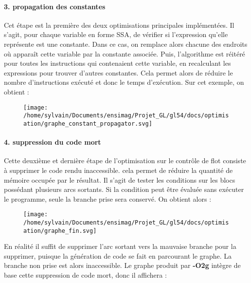 \documentclass[
]{article}
\begin{document}
\hypertarget{3-propagation-des-constantes}{%
\paragraph{3. propagation des
constantes}\label{3-propagation-des-constantes}}

Cet étape est la première des deux optimisations principales
implémentées. Il s'agit, pour chaque variable en forme SSA, de vérifier
si l'expression qu'elle représente est une constante. Dans ce cas, on
remplace alors chacune des endroits où apparaît cette variable par la
constante associée. Puis, l'algorithme est réitéré pour toutes les
instructions qui contenaient cette variable, en recalculant les
expressions pour trouver d'autres constantes. Cela permet alors de
réduire le nombre d'instructions exécuté et donc le temps d'exécution.
Sur cet exemple, on obtient :

\begin{figure}
\centering
\texttt{[image: /home/sylvain/Documents/ensimag/Projet\_GL/gl54/docs/optimisation/graphe\_constant\_propagator.svg]}
\caption{}
\end{figure}

\hypertarget{4-suppression-du-code-mort}{%
\paragraph{\texorpdfstring{4. suppression du code mort
}{4. suppression du code mort }}\label{4-suppression-du-code-mort}}

Cette deuxième et dernière étape de l'optimisation sur le contrôle de
flot consiste à supprimer le code rendu inaccessible. cela permet de
réduire la quantité de mémoire occupée par le résultat. Il s'agit de
tester les conditions sur les blocs possédant plusieurs arcs sortants.
Si la condition peut être évaluée sans exécuter le programme, seule la
branche prise sera conservé. On obtient alors :

\begin{figure}
\centering
\texttt{[image: /home/sylvain/Documents/ensimag/Projet\_GL/gl54/docs/optimisation/graphe\_fin.svg]}
\caption{}
\end{figure}

En réalité il suffit de supprimer l'arc sortant vers la mauvaise branche
pour la supprimer, puisque la génération de code se fait en parcourant
le graphe. La branche non prise est alors inaccessible. Le graphe
produit par \textbf{-O2g} intègre de base cette suppression de code
mort, donc il affichera :
\end{document}
